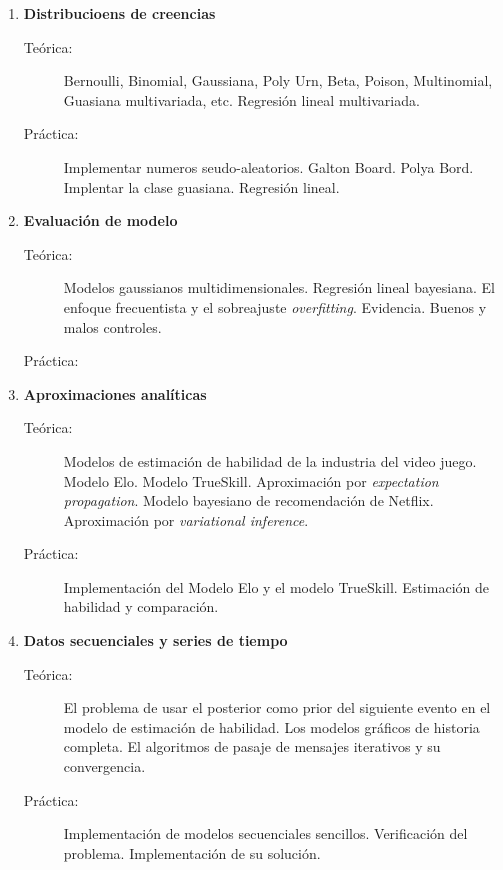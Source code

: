 \documentclass[10pt]{article}
\begin{document}
\begin{enumerate}

\vspace{0.1cm}
\item \textbf{Distribucioens de creencias}
\vspace{-0.15cm}
\begin{description}
\item[Teórica:] Bernoulli, Binomial, Gaussiana, Poly Urn, Beta, Poison, Multinomial, Guasiana multivariada, etc. Regresión lineal multivariada.
\item[Práctica:] Implementar numeros seudo-aleatorios. Galton Board. Polya Bord. Implentar la clase guasiana. Regresión lineal.
\end{description}


\vspace{0.1cm}
\item \textbf{Evaluación de modelo}
\vspace{-0.15cm}
\begin{description}
\item[Teórica:] Modelos gaussianos multidimensionales. Regresión lineal bayesiana. El enfoque frecuentista y el sobreajuste \emph{overfitting}. Evidencia. Buenos y malos controles.
\item[Práctica:]
\end{description}


\vspace{0.1cm}
\item \textbf{Aproximaciones analíticas}
\vspace{-0.15cm}
\begin{description}
\item[Teórica:] Modelos de estimación de habilidad de la industria del video juego. Modelo Elo. Modelo TrueSkill. Aproximación por \emph{expectation propagation}. Modelo bayesiano de recomendación de Netflix. Aproximación por \emph{variational inference}.
\item[Práctica:] Implementación del Modelo Elo y el modelo TrueSkill. Estimación de habilidad y comparación.
\end{description}


\vspace{0.1cm}
\item \textbf{Datos secuenciales y series de tiempo}
\vspace{-0.15cm}
\begin{description}
\item[Teórica:] El problema de usar el posterior como prior del siguiente evento en el modelo de estimación de habilidad. Los modelos gráficos de historia completa. El algoritmos de pasaje de mensajes iterativos y su convergencia.
\item[Práctica:] Implementación de modelos secuenciales sencillos. Verificación del problema. Implementación de su solución.
\end{description}


\end{enumerate}
\end{document}
